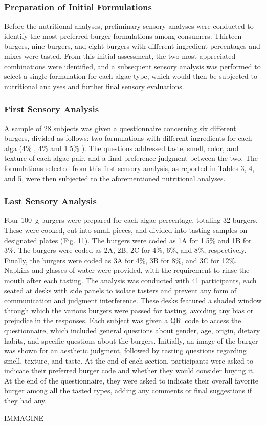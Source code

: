 \subsubsection{Preparation of Initial Formulations}
Before the nutritional analyses, preliminary sensory analyses were conducted to identify the most preferred burger formulations among consumers. Thirteen  burgers, nine  burgers, and eight  burgers with different ingredient percentages and mixes were tasted. From this initial assessment, the two most appreciated combinations were identified, and a subsequent sensory analysis was performed to select a single formulation for each algae type, which would then be subjected to nutritional analyses and further final sensory evaluations.

\subsubsection{First Sensory Analysis}
A sample of 28 subjects was given a questionnaire concerning six different burgers, divided as follows: two formulations with different ingredients for each alga (4\% , 4\%  and 1.5\% ). The questions addressed taste, smell, color, and texture of each algae pair, and a final preference judgment between the two.
The formulations selected from this first sensory analysis, as reported in Tables 3, 4, and 5, were then subjected to the aforementioned nutritional analyses.

\subsubsection{Last Sensory Analysis}
Four \qty{100}{\gram} burgers were prepared for each algae percentage, totaling 32 burgers. These were cooked, cut into small pieces, and divided into tasting samples on designated plates (Fig. 11). The  burgers were coded as 1A for 1.5\% and 1B for 3\%. The  burgers were coded as 2A, 2B, 2C for 4\%, 6\%, and 8\%, respectively. Finally, the  burgers were coded as 3A for 4\%, 3B for 8\%, and 3C for 12\%.
Napkins and glasses of water were provided, with the requirement to rinse the mouth after each tasting. The analysis was conducted with 41 participants, each seated at desks with side panels to isolate tasters and prevent any form of communication and judgment interference. These desks featured a shaded window through which the various burgers were passed for tasting, avoiding any bias or prejudice in the responses. Each subject was given a QR~code to access the questionnaire, which included general questions about gender, age, origin, dietary habits, and specific questions about the burgers. Initially, an image of the burger was shown for an aesthetic judgment, followed by tasting questions regarding smell, texture, and taste. At the end of each section, participants were asked to indicate their preferred burger code and whether they would consider buying it. At the end of the questionnaire, they were asked to indicate their overall favorite burger among all the tasted types, adding any comments or final suggestions if they had any.

IMMAGINE

